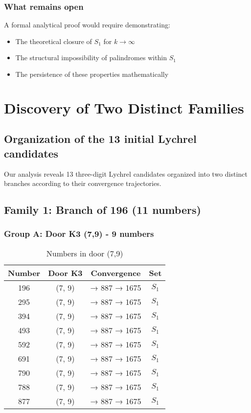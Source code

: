 \documentclass[12pt,a4paper]{article}
\theoremstyle{remark}
\begin{document}
\subsubsection{What remains open}

A formal analytical proof would require demonstrating:
\begin{itemize}
\item The theoretical closure of $S_1$ for $k \to \infty$
\item The structural impossibility of palindromes within $S_1$
\item The persistence of these properties mathematically
\end{itemize}


\section{Discovery of Two Distinct Families}
\label{sec:two_families}

\subsection{Organization of the 13 initial Lychrel candidates}

Our analysis reveals 13 three-digit Lychrel candidates organized into two distinct branches according to their convergence trajectories.

\subsection{Family 1: Branch of 196 (11 numbers)}

\subsubsection{Group A: Door K3 (7,9) - 9 numbers}

\begin{table}[h]
\centering
\caption{Numbers in door (7,9)}
\begin{tabular}{cccc}
\toprule
\textbf{Number} & \textbf{Door K3} & \textbf{Convergence} & \textbf{Set}\\
\midrule
196 & (7, 9) & → 887 → 1675 & $S_1$\\
295 & (7, 9) & → 887 → 1675 & $S_1$\\
394 & (7, 9) & → 887 → 1675 & $S_1$\\
493 & (7, 9) & → 887 → 1675 & $S_1$\\
592 & (7, 9) & → 887 → 1675 & $S_1$\\
691 & (7, 9) & → 887 → 1675 & $S_1$\\
790 & (7, 9) & → 887 → 1675 & $S_1$\\
788 & (7, 9) & → 887 → 1675 & $S_1$\\
877 & (7, 9) & → 887 → 1675 & $S_1$\\
\bottomrule
\end{tabular}
\end{table}
\end{document}
